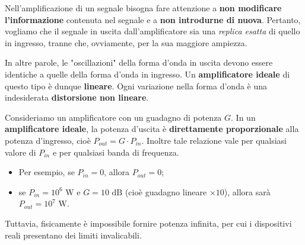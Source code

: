 \documentclass[openany,a4paper,12pt]{book}
\begin{document}
Nell'amplificazione di un segnale bisogna fare attenzione a \textbf{non modificare l'informazione} contenuta nel segnale e a \textbf{non introdurne di nuova}. Pertanto, vogliamo che il segnale in uscita dall'amplificatore sia una \textit{replica esatta} di quello in ingresso, tranne che, ovviamente, per la sua maggiore ampiezza. 

In altre parole, le "oscillazioni" della forma d'onda in uscita devono essere identiche a quelle della forma d'onda in ingresso. Un \textbf{amplificatore ideale} di questo tipo è dunque \textbf{lineare}. Ogni variazione nella forma d'onda è una indesiderata \textbf{distorsione non lineare}.

Consideriamo un amplificatore con un guadagno di potenza $G$. 
In un \textbf{amplificatore ideale}, la potenza d'uscita è \textbf{direttamente proporzionale} alla potenza d'ingresso, cioè $P_{out} = G \cdot P_{in}$. Inoltre tale relazione vale per qualsiasi valore di $P_{in}$ e per qualsiasi banda di frequenza.
\begin{itemize}[label=\textcolor{PoliBlue}{\textbullet}]
    \item Per esempio, se $P_{in} = 0$, allora $P_{out} = 0$;
    \item se $P_{in} = 10^6 \text{ W}$ e $G = \text{10 dB}$ (cioè guadagno lineare $\times 10$), allora sarà $P_{out} = 10^7 \text{ W}$.
\end{itemize}
Tuttavia, fisicamente è impossibile fornire potenza infinita, per cui i dispositivi reali presentano dei limiti invalicabili.
\end{document}
